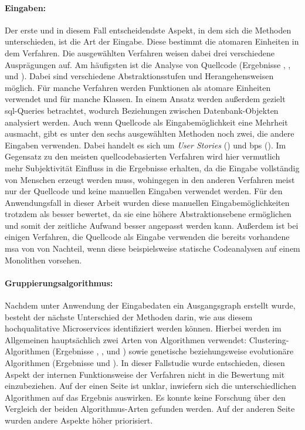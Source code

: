 \paragraph{Eingaben:} Der erste und in diesem Fall entscheidendste Aspekt, in dem sich die Methoden unterschieden, ist die Art der Eingabe.
Diese bestimmt die atomaren Einheiten in dem Verfahren.
Die ausgewählten Verfahren weisen dabei drei verschiedene Ausprägungen auf.
Am häufigsten ist die Analyse von Quellcode (Ergebnisse , ,  und ).
Dabei sind verschiedene Abstraktionsstufen und Her\-an\-ge\-hens\-wei\-sen möglich.
Für manche Verfahren werden Funktionen als atomare Einheiten verwendet und für manche Klassen.
In einem Ansatz werden außerdem gezielt \gls{sql}-Queries betrachtet, wodurch Beziehungen zwischen Datenbank-Objekten analysiert werden.
Auch wenn Quellcode als Eingabemöglichkeit eine Mehrheit ausmacht, gibt es unter den sechs ausgewählten Methoden noch zwei, die andere Eingaben verwenden.
Dabei handelt es sich um \emph{User Stories} () und \glspl{bp} ().
Im Gegensatz zu den meisten quellcodebasierten Verfahren wird hier vermutlich mehr Subjektivität Einfluss in die Ergebnisse erhalten, da die Eingabe vollständig von Menschen erzeugt werden muss, wohingegen in den anderen Verfahren meist nur der Quellcode und keine manuellen Eingaben verwendet werden.
Für den Anwendungsfall in dieser Arbeit wurden diese manuellen Eingabemöglichkeiten trotzdem als besser bewertet, da sie eine höhere Abstraktionsebene ermöglichen und somit der zeitliche Aufwand besser angepasst werden kann.
Außerdem ist bei einigen Verfahren, die Quellcode als Eingabe verwenden die bereits vorhandene \gls{msa} von \jf von Nachteil, wenn diese beispielsweise statische Codeanalysen auf einem Monolithen vorsehen.

\paragraph{Gruppierungsalgorithmus:}
Nachdem unter Anwendung der Eingabedaten ein Ausgangsgraph erstellt wurde, besteht der nächste Unterschied der Methoden darin, wie aus diesem hochqualitative Microservices identifiziert werden können.
Hierbei werden im Allgemeinen hauptsächlich zwei Arten von Algorithmen verwendet: Clustering-Algorithmen (Ergebnisse , ,  und ) sowie genetische beziehungsweise evolutionäre Algorithmen (Ergebnisse  und ).
In dieser Fallstudie wurde entschieden, diesen Aspekt der internen Funktionsweise der Verfahren nicht in die Bewertung mit einzubeziehen.
Auf der einen Seite ist unklar, inwiefern sich die unterschiedlichen Algorithmen auf das Ergebnis auswirken.
Es konnte keine Forschung über den Vergleich der beiden Algorithmus-Arten gefunden werden.
Auf der anderen Seite wurden andere Aspekte höher priorisiert.

